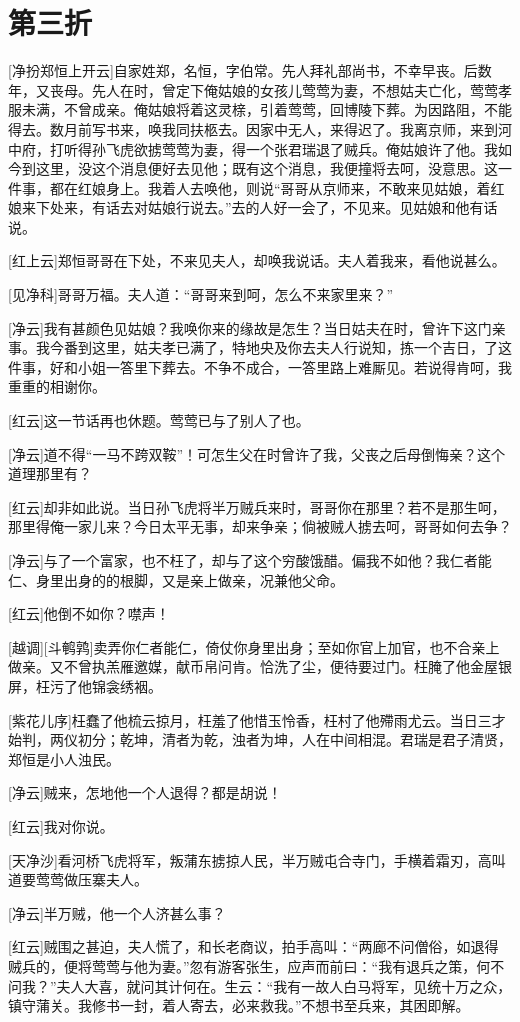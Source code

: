 \documentclass{book}
\newcommand\nchapter[1]{\chapter*{#1}\markboth{#1}{}\addcontentsline{toc}{chapter}{#1}}
\begin{document}
\nchapter{第三折}

[净扮郑恒上开云]自家姓郑，名恒，字伯常。先人拜礼部尚书，不幸早丧。后数年，又丧母。先人在时，曾定下俺姑娘的女孩儿莺莺为妻，不想姑夫亡化，莺莺孝服未满，不曾成亲。俺姑娘将着这灵榇，引着莺莺，回博陵下葬。为因路阻，不能得去。数月前写书来，唤我同扶柩去。因家中无人，来得迟了。我离京师，来到河中府，打听得孙飞虎欲掳莺莺为妻，得一个张君瑞退了贼兵。俺姑娘许了他。我如今到这里，没这个消息便好去见他；既有这个消息，我便撞将去呵，没意思。这一件事，都在红娘身上。我着人去唤他，则说``哥哥从京师来，不敢来见姑娘，着红娘来下处来，有话去对姑娘行说去。''去的人好一会了，不见来。见姑娘和他有话说。

[红上云]郑恒哥哥在下处，不来见夫人，却唤我说话。夫人着我来，看他说甚么。

[见净科]哥哥万福。夫人道：``哥哥来到呵，怎么不来家里来？''

[净云]我有甚颜色见姑娘？我唤你来的缘故是怎生？当日姑夫在时，曾许下这门亲事。我今番到这里，姑夫孝已满了，特地央及你去夫人行说知，拣一个吉日，了这件事，好和小姐一答里下葬去。不争不成合，一答里路上难厮见。若说得肯呵，我重重的相谢你。

[红云]这一节话再也休题。莺莺已与了别人了也。

[净云]道不得``一马不跨双鞍''！可怎生父在时曾许了我，父丧之后母倒悔亲？这个道理那里有？

[红云]却非如此说。当日孙飞虎将半万贼兵来时，哥哥你在那里？若不是那生呵，那里得俺一家儿来？今日太平无事，却来争亲；倘被贼人掳去呵，哥哥如何去争？

[净云]与了一个富家，也不枉了，却与了这个穷酸饿醋。偏我不如他？我仁者能仁、身里出身的的根脚，又是亲上做亲，况兼他父命。

[红云]他倒不如你？噤声！

[越调][斗鹌鹑]卖弄你仁者能仁，倚仗你身里出身；至如你官上加官，也不合亲上做亲。又不曾执羔雁邀媒，献币帛问肯。恰洗了尘，便待要过门。枉腌了他金屋银屏，枉污了他锦衾绣裀。

[紫花儿序]枉蠢了他梳云掠月，枉羞了他惜玉怜香，枉村了他殢雨尤云。当日三才始判，两仪初分；乾坤，清者为乾，浊者为坤，人在中间相混。君瑞是君子清贤，郑恒是小人浊民。

[净云]贼来，怎地他一个人退得？都是胡说！

[红云]我对你说。

[天净沙]看河桥飞虎将军，叛蒲东掳掠人民，半万贼屯合寺门，手横着霜刃，高叫道要莺莺做压寨夫人。

[净云]半万贼，他一个人济甚么事？

[红云]贼围之甚迫，夫人慌了，和长老商议，拍手高叫：``两廊不问僧俗，如退得贼兵的，便将莺莺与他为妻。''忽有游客张生，应声而前曰：``我有退兵之策，何不问我？''夫人大喜，就问其计何在。生云：``我有一故人白马将军，见统十万之众，镇守蒲关。我修书一封，着人寄去，必来救我。''不想书至兵来，其困即解。
\end{document}
